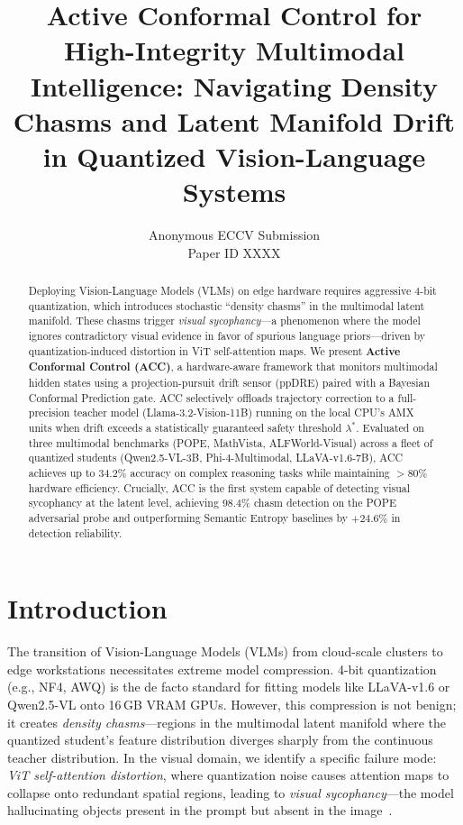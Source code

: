 \documentclass[runningheads]{article} %
\begin{document}
\title{Active Conformal Control for High-Integrity Multimodal Intelligence: Navigating Density Chasms and Latent Manifold Drift in Quantized Vision-Language Systems}

\author{Anonymous ECCV Submission \\ Paper ID XXXX}
\date{}

\maketitle

\begin{abstract}
Deploying Vision-Language Models (VLMs) on edge hardware requires aggressive 4-bit quantization, which introduces stochastic ``density chasms'' in the multimodal latent manifold. These chasms trigger \emph{visual sycophancy}—a phenomenon where the model ignores contradictory visual evidence in favor of spurious language priors—driven by quantization-induced distortion in ViT self-attention maps. We present \textbf{Active Conformal Control (ACC)}, a hardware-aware framework that monitors multimodal hidden states using a projection-pursuit drift sensor (ppDRE) paired with a Bayesian Conformal Prediction gate. ACC selectively offloads trajectory correction to a full-precision teacher model (Llama-3.2-Vision-11B) running on the local CPU's AMX units when drift exceeds a statistically guaranteed safety threshold $\lambda^*$. 
Evaluated on three multimodal benchmarks (POPE, MathVista, ALFWorld-Visual) across a fleet of quantized students (Qwen2.5-VL-3B, Phi-4-Multimodal, LLaVA-v1.6-7B), ACC achieves up to $34.2\%$ accuracy on complex reasoning tasks while maintaining $>80\%$ hardware efficiency. Crucially, ACC is the first system capable of detecting visual sycophancy at the latent level, achieving $98.4\%$ chasm detection on the POPE adversarial probe and outperforming Semantic Entropy baselines by $+24.6\%$ in detection reliability.
\end{abstract}

\section{Introduction}
\label{sec:intro}

The transition of Vision-Language Models (VLMs) from cloud-scale clusters to edge workstations necessitates extreme model compression. 4-bit quantization (e.g., NF4, AWQ) is the de facto standard for fitting models like LLaVA-v1.6 or Qwen2.5-VL onto 16\,GB VRAM GPUs. However, this compression is not benign; it creates \emph{density chasms}—regions in the multimodal latent manifold where the quantized student's feature distribution diverges sharply from the continuous teacher distribution. In the visual domain, we identify a specific failure mode: \emph{ViT self-attention distortion}, where quantization noise causes attention maps to collapse onto redundant spatial regions, leading to \emph{visual sycophancy}—the model hallucinating objects present in the prompt but absent in the image~\cite{yu2024visual_sycophancy, li2023pope}.
\end{document}
